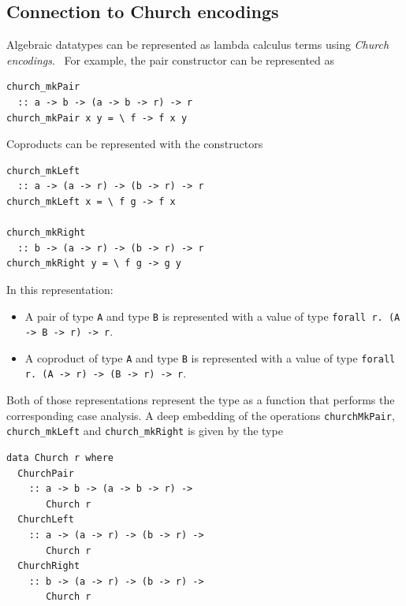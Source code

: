 \documentclass[sigplan,anonymous,review]{acmart}
\newcommand{\ttt}{\texttt}
\newcommand{\showtodos}{}  %
\newenvironment{todo}
  {\ifthenelse{\isundefined{\showtodos}}{\comment}{\begin{tcolorbox}
    \textbf{TODO}:}}
  {\ifthenelse{\isundefined{\showtodos}}{\endcomment}{\end{tcolorbox}}
  }
\begin{document}
\subsection{Connection to Church encodings}

Algebraic datatypes can be represented as lambda calculus terms using
\textit{Church encodings}.~\cite{Boehm:1985:AutoSynth} For example, the pair constructor can be
represented as

\begin{lstlisting}
church_mkPair
  :: a -> b -> (a -> b -> r) -> r
church_mkPair x y = \ f -> f x y
\end{lstlisting}

Coproducts can be represented with the constructors

\begin{lstlisting}
church_mkLeft
  :: a -> (a -> r) -> (b -> r) -> r
church_mkLeft x = \ f g -> f x

church_mkRight
  :: b -> (a -> r) -> (b -> r) -> r
church_mkRight y = \ f g -> g y
\end{lstlisting}

In this representation:

\begin{itemize}
  \item A pair of type \ttt{A} and type \ttt{B} is represented with a value of type
\ttt{forall r. (A -> B -> r) -> r}.

  \item A coproduct of type \ttt{A} and type \ttt{B} is represented with a value of type
\ttt{forall r. (A -> r) -> (B -> r) -> r}.
\end{itemize}

Both of those representations represent the type as a function that performs the
corresponding case analysis. A deep embedding of the operations
\ttt{churchMkPair}, \ttt{church\_mkLeft} and \ttt{church\_mkRight} is given
by the type

\begin{lstlisting}
data Church r where
  ChurchPair
    :: a -> b -> (a -> b -> r) ->
       Church r
  ChurchLeft
    :: a -> (a -> r) -> (b -> r) ->
       Church r
  ChurchRight
    :: b -> (a -> r) -> (b -> r) ->
       Church r
\end{lstlisting}
\end{document}
